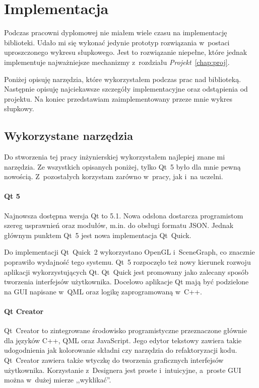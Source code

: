 \chapter{Implementacja}
Podczas pracowni dyplomowej nie miałem wiele czasu na implementację biblioteki. Udało mi się wykonać jedynie prototyp rozwiązania w~postaci uproszczonego wykresu słupkowego. Jest to rozwiązanie niepełne, które jednak implementuje najważniejsze mechanizmy z~rozdziału \textit{Projekt}~\ref{chap:proj}. 

Poniżej opisuję narzędzia, które wykorzystałem podczas prac nad biblioteką. Następnie opisuję najciekawsze szczegóły implementacyjne oraz odstąpienia od projektu. Na koniec przedstawiam zaimplementowany przeze mnie wykres słupkowy.

\section{Wykorzystane narzędzia}
Do stworzenia tej pracy inżynierskiej wykorzystałem najlepiej znane mi narzędzia. Ze wszystkich opisanych poniżej, tylko Qt~5 było dla mnie pewną nowością. Z~pozostałych korzystam zarówno w~pracy, jak i~na uczelni.
 
\subsubsection{Qt 5}
Najnowsza dostępna wersja Qt to 5.1. Nowa odsłona dostarcza programistom szereg usprawnień oraz modułów, m.in. do obsługi formatu JSON. Jednak głównym punktem Qt~5 jest nowa implementacja Qt~Quick. 

Do implementacji Qt~Quick~2 wykorzystano OpenGL i~SceneGraph, co znacznie poprawiło wydajność tego systemu. Qt~5 rozpoczęło też nowy kierunek rozwoju aplikacji wykorzystujących Qt. Qt~Quick jest promowany jako zalecany sposób tworzenia interfejsów użytkownika. Docelowo aplikacje Qt mają być podzielone na GUI napisane w~QML oraz logikę zaprogramowaną w~C++.

\subsubsection{Qt Creator}
Qt~Creator to zintegrowane środowisko programistyczne przeznaczone głównie dla języków C++, QML oraz JavaScript. Jego edytor tekstowy zawiera takie udogodnienia jak kolorowanie składni czy narzędzia do refaktoryzacji kodu. Qt~Creator zawiera także wtyczkę do tworzenia graficznych interfejsów użytkownika. Korzystanie z~Designera jest proste i~intuicyjne, a~proste GUI można w~dużej mierze ,,wyklikać''.

